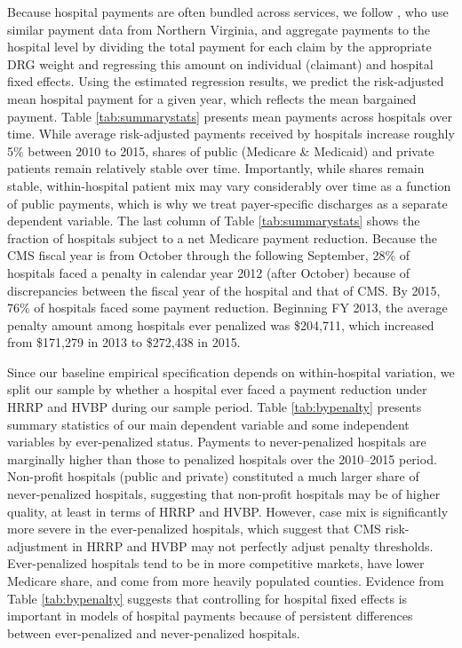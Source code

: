 \documentclass[12pt]{article}
\begin{document}
Because hospital payments are often bundled across services, we follow \citet{gowrisankaran2015}, who use similar payment data from Northern Virginia, and aggregate payments to the hospital level by dividing the total payment for each claim by the appropriate DRG weight and regressing this amount on individual (claimant) and hospital fixed effects.  Using the estimated regression results, we predict the risk-adjusted mean hospital payment for a given year, which reflects the mean bargained payment. Table \ref{tab:summarystats} presents mean payments across hospitals over time. While average risk-adjusted payments received by hospitals increase roughly 5$\%$ between 2010 to 2015, shares of public (Medicare \& Medicaid) and private patients remain relatively stable over time.  Importantly, while shares remain stable, within-hospital patient mix may vary considerably over time as a function of public payments, which is why we treat payer-specific discharges as a separate dependent variable.  The last column of Table \ref{tab:summarystats} shows the fraction of hospitals subject to a net Medicare payment reduction.  Because the CMS fiscal year is from October through the following September, 28$\%$ of hospitals faced a penalty in calendar year 2012 (after October) because of discrepancies between the fiscal year of the hospital and that of CMS.  By 2015, 76$\%$ of hospitals faced some payment reduction. Beginning FY 2013, the average penalty amount among hospitals ever penalized was \$204,711, which increased from \$171,279 in 2013 to \$272,438 in 2015.


Since our baseline empirical specification depends on within-hospital variation, we split our sample by whether a hospital ever faced a payment reduction under HRRP and HVBP during our sample period.  Table \ref{tab:bypenalty} presents summary statistics of our main dependent variable and some independent variables by ever-penalized status.  Payments to never-penalized hospitals are marginally higher than those to penalized hospitals over the 2010--2015 period.  Non-profit hospitals (public and private) constituted a much larger share of never-penalized hospitals, suggesting that non-profit hospitals may be of higher quality, at least in terms of HRRP and HVBP.  However, case mix is significantly more severe in the ever-penalized hospitals, which suggest that CMS risk-adjustment in HRRP and HVBP may not perfectly adjust penalty thresholds.  Ever-penalized hospitals tend to be in more competitive markets, have lower Medicare share, and come from more heavily populated counties.  Evidence from Table \ref{tab:bypenalty} suggests that controlling for hospital fixed effects is important in models of hospital payments because of persistent differences between ever-penalized and never-penalized hospitals.
\end{document}

